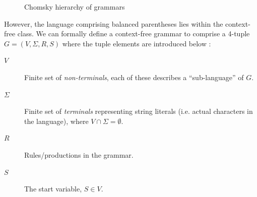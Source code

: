 \documentclass[a4paper,openany,12pt]{book}
\begin{document}
\begin{figure}[H]
    \begin{MyMdframed}
        \vspace{0.5em}
        \caption{\label{fig:chomsky:1} Chomsky hierarchy of grammars}
        \vspace{0.5em}
        \captionsetup{style=default}
        \begin{adjustbox}{center} 
        \end{adjustbox}
    \end{MyMdframed}
\end{figure}

However, the language comprising balanced parentheses lies within the context-free class.
We can formally define a context-free grammar to comprise a 4-tuple $G = (V, \Sigma, R, S)$ where the tuple elements
are introduced below \citep[p.~102]{sipser2012introduction}:

\begin{description}
    \item[$V$] Finite set of \emph{non-terminals}, each of these describes a ``sub-language'' of $G$.
    \item[$\Sigma$] Finite set of \emph{terminals} representing string literals (i.e. actual characters in the language), where $V \cap \Sigma = \emptyset$.
    \item[$R$] Rules/productions in the grammar.
    \item[$S$] The start variable, $S \in V$.
\end{description}
\end{document}
